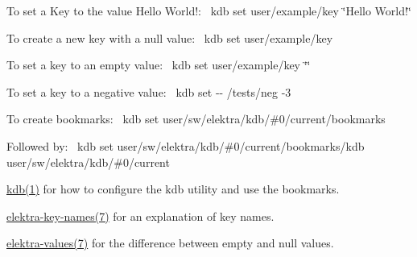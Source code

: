 To set a Key to the value {\ttfamily Hello World!}\+:~\newline
 {\ttfamily kdb set user/example/key \char`\"{}\+Hello World!\char`\"{}}

To create a new key with a null value\+:~\newline
 {\ttfamily kdb set user/example/key}

To set a key to an empty value\+:~\newline
 {\ttfamily kdb set user/example/key \char`\"{}\char`\"{}}

To set a key to a negative value\+:~\newline
 {\ttfamily kdb set -\/-\/ /tests/neg -\/3}

To create bookmarks\+:~\newline
 {\ttfamily kdb set user/sw/elektra/kdb/\#0/current/bookmarks}

Followed by\+:~\newline
 {\ttfamily kdb set user/sw/elektra/kdb/\#0/current/bookmarks/kdb user/sw/elektra/kdb/\#0/current}


\begin{DoxyItemize}
\item \mbox{\hyperlink{doc_help_kdb_md}{kdb(1)}} for how to configure the kdb utility and use the bookmarks.
\item \mbox{\hyperlink{doc_help_elektra-key-names_md}{elektra-\/key-\/names(7)}} for an explanation of key names.
\item \mbox{\hyperlink{doc_help_elektra-values_md}{elektra-\/values(7)}} for the difference between empty and null values. 
\end{DoxyItemize}